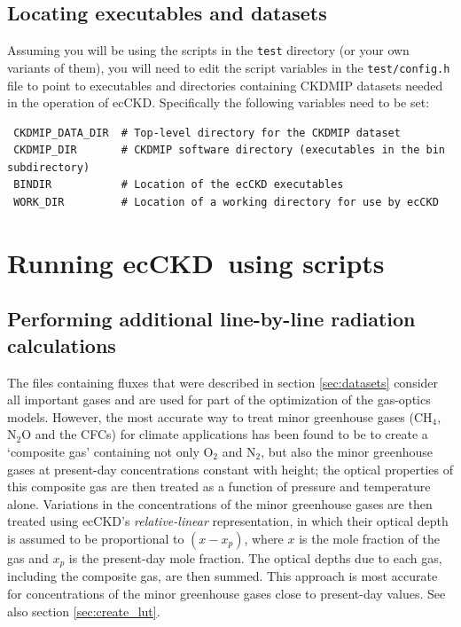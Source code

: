 \documentclass[a4,oneside]{article}
\def\codesize{\small}
\newcommand{\ecckd}{ecCKD}
\def\codesize{\small}
\def\code#1{{\codesize\texttt{#1}}}
\begin{document}
\subsection{Locating executables and datasets}
Assuming you will be using the scripts in the \code{test} directory
(or your own variants of them), you will need to edit the script
variables in the \code{test/config.h} file to point to executables and
directories containing CKDMIP datasets needed in the operation of
\ecckd. Specifically the following variables need to be set:
\begin{lstlisting}
 CKDMIP_DATA_DIR  # Top-level directory for the CKDMIP dataset
 CKDMIP_DIR       # CKDMIP software directory (executables in the bin subdirectory)
 BINDIR           # Location of the ecCKD executables
 WORK_DIR         # Location of a working directory for use by ecCKD
\end{lstlisting}

\section{Running \ecckd\ using scripts}
\label{sec:scripts}
\subsection{Performing additional line-by-line radiation calculations}
\label{sec:additional}
The files containing fluxes that were described in section
\ref{sec:datasets} consider all important gases and are used for part
of the optimization of the gas-optics models. However, the most
accurate way to treat minor greenhouse gases (CH$_4$, N$_2$O and the
CFCs) for climate applications has been found to be to create a
`composite gas' containing not only O$_2$ and N$_2$, but also the
minor greenhouse gases at present-day concentrations constant with
height; the optical properties of this composite gas are then treated
as a function of pressure and temperature alone. Variations in the
concentrations of the minor greenhouse gases are then treated using
\ecckd's \emph{relative-linear} representation, in which their optical
depth is assumed to be proportional to $(x-x_p)$, where $x$ is the
mole fraction of the gas and $x_p$ is the present-day mole
fraction. The optical depths due to each gas, including the composite
gas, are then summed. This approach is most accurate for
concentrations of the minor greenhouse gases close to present-day
values. See also section \ref{sec:create_lut}.
\end{document}
